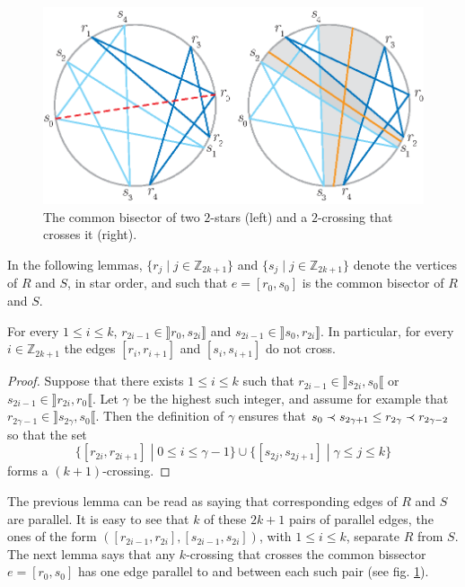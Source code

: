 \documentclass[12pt]{amsart}
\begin{document}
\begin{figure}
\centerline{\includegraphics[scale=1]{combisector.eps}}
\caption{\small{The common bisector of two $2$-stars (left) and a $2$-crossing that crosses it (right).}}\label{combisector}
\end{figure}

In the following lemmas, $\{r_j\;|\; j\in\mathbb{Z}_{2k+1}\}$ and $\{s_j\;|\; j\in\mathbb{Z}_{2k+1}\}$ denote the vertices of $R$ and $S$, in star order, and such that $e=[r_0,s_0]$ is the common bisector of $R$ and $S$.

\begin{lemma}\label{paralleledges}
For every $1\le i\le k$, $r_{2i-1}\in\rrbracket r_0,s_{2i}\rrbracket$ and $s_{2i-1}\in\rrbracket s_0,r_{2i}\rrbracket$.
In particular, for every $i\in\mathbb{Z}_{2k+1}$ the edges $[r_i,r_{i+1}]$ and $[s_i,s_{i+1}]$ do not cross.
\end{lemma}

\begin{proof}
Suppose that there exists $1\le i\le k$ such that $r_{2i-1}\in\rrbracket s_{2i},s_0\llbracket$ or $s_{2i-1}\in\rrbracket r_{2i},r_0\llbracket$. Let $\gamma$ be the highest such integer, and assume for example that $r_{2\gamma-1}\in\rrbracket s_{2\gamma},s_0\llbracket$. Then the definition of $\gamma$ ensures that
$s_0\prec s_{2\gamma+1}\le r_{2\gamma}\prec r_{2\gamma-2}$
so that the set
$$\{[r_{2i},r_{2i+1}]\;|\; 0\le i\le\gamma-1\}\cup\{[s_{2j},s_{2j+1}]\;|\; \gamma\le j\le k\}$$
forms a $(k+1)$-crossing.
\end{proof}

The previous lemma can be read as saying that corresponding edges of $R$ and $S$ are parallel. It is easy to see that $k$ of these $2k+1$ pairs of parallel edges, the ones of the form $([r_{2i-1},r_{2i}],[s_{2i-1},s_{2i}])$, with $1\le i\le k$, separate $R$ from $S$. The next lemma says that any $k$-crossing that crosses the common bissector $e=[r_0,s_0]$ has one edge parallel to and between each such pair (see fig. \ref{combisector}).
\end{document}
